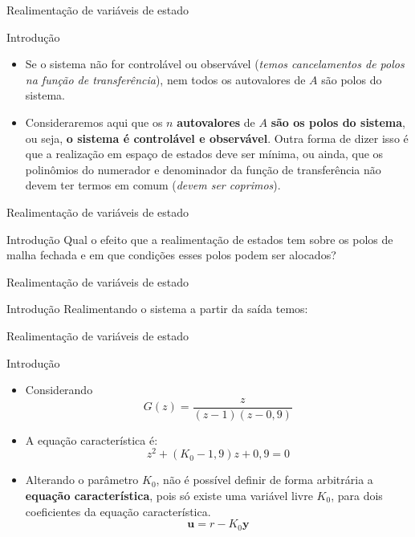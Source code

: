 \begin{frame}{Realimentação de variáveis de estado}
\begin{block}{Introdução}
\begin{itemize}
    \item Se o sistema não for controlável ou observável (\textit{temos cancelamentos de polos na função de transferência}), nem todos os autovalores de $A$ são polos do sistema. 
    \item Consideraremos aqui que os $n$ \textbf{autovalores} de $A$ \textbf{são os polos do sistema}, ou seja, \textbf{o sistema é controlável e observável}. Outra forma de dizer isso é que a realização em espaço de estados deve ser mínima, ou  ainda, que os polinômios do numerador e denominador da função de transferência não devem ter termos em comum (\textit{devem ser coprimos}).
\end{itemize}
\end{block}
\end{frame}

\begin{frame}{Realimentação de variáveis de estado}
\begin{block}{Introdução}
	Qual o efeito que a realimentação de estados tem sobre os polos de malha fechada e em que condições esses polos podem ser alocados?
\end{block}
\vspace{0,1 cm}
\centering
\scalebox{.8}{}
\end{frame}

\begin{frame}{Realimentação de variáveis de estado}
\begin{block}{Introdução}
	Realimentando o sistema a partir da saída temos:
\end{block}
\vspace{0,1 cm}
\centering
\scalebox{.8}{}
\end{frame}

\begin{frame}{Realimentação de variáveis de estado}
\begin{block}{Introdução}
	\begin{itemize} 
	\item Considerando\\
	$$ G(z) = \dfrac{z}{(z-1)(z-0,9)}$$
	\item A equação característica é:\\
	$$ z^2 + (K_0 - 1,9)z + 0,9 = 0 $$
	\item Alterando o parâmetro $ K_0 $, não é possível definir de forma arbitrária a \textbf{equação característica}, pois só existe uma variável livre $ K_0 $, para dois coeficientes da equação característica.
	$$ \bm{u} = r - K_0\bm{y} $$
	\end{itemize}
\end{block}
\end{frame}

